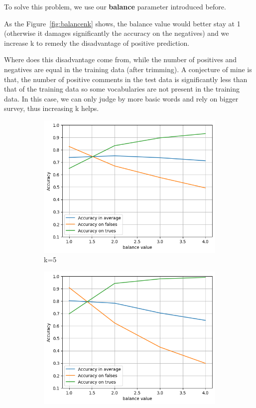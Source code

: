 \documentclass{article}
\begin{document}
To solve this problem, we use our \textbf{balance} parameter introduced before.

As the Figure~\ref{fig:balancenk} shows, the balance value would
better stay at 1 (otherwise it damages significantly
the accuracy on the negatives) and we increase k to
remedy the disadvantage of positive prediction.

Where does this disadvantage come from, while the number
of positives and negatives are equal in the training data (after trimming).
A conjecture of mine is that, the number of positive comments in the test data
is significantly less than that of the training data so
some vocabularies are not present in the training data. In this case,
we can only judge by more basic words and rely on bigger survey, thus increasing k helps.

\begin{figure}[H]
  \centering
  \begin{subfigure}[t]{0.33\textwidth}
    \centering
    \includegraphics[width=\linewidth]{balancek5.png}
    \caption{k=5}
  \end{subfigure}%
  \hfill
  \begin{subfigure}[t]{0.33\textwidth}
    \centering
    \includegraphics[width=\linewidth]{balancek50.png}

\end{subfigure}
\end{figure}
\end{document}
